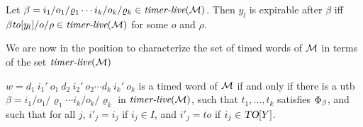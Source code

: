\begin{lemma}
\label{expirable}
Let $\beta  =  {i_1/o_1/\varrho_1}  \cdots {i_k/o_k/\varrho_k} \in \mbox{\it timer-live}({{\mathcal M}})$.
Then $y_l$ is expirable after $\beta$ iff $\beta \mathit{to}[y_l]/o/\rho \in \mbox{\it timer-live}({{\mathcal M}})$ for some $o$ and $\rho$.
\end{lemma}

We are now in the position to characterize the set of
timed words of ${\mathcal M}$ in terms of the set $\mbox{\it timer-live}({{\mathcal M}})$

\begin{theorem}
\label{thm:characterization}
$w =  d_1 ~ i_1' ~ o_1 ~ d_2 ~ i_2' ~ o_2 \cdots d_k ~ i_k' ~ o_k$
  is a timed word of ${\mathcal M}$ if and only if there is 
  a utb 
  $\beta = {i_1/o_1/\varrho_1}  \cdots {i_k/o_k/\varrho_k}$
   in $\mbox{\it timer-live}({{\mathcal M}})$,
such that $t_1, \ldots, t_k$ satisfies $\Phi_{\beta}$, and
  such that   for all  $j$,
$i'_j   =   i_j$ if $i_j \in I$, and
$i'_j   = \mathit{to}$ if $i_j \in \mbox{\sl TO}[Y]$.
\end{theorem}
  

